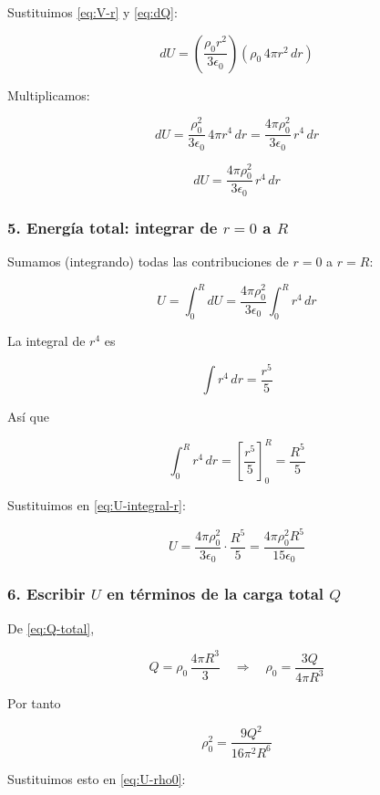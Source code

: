 \documentclass{article}
\begin{document}
Sustituimos \eqref{eq:V-r} y \eqref{eq:dQ}:

\[
dU = \left(\frac{\rho_{0}r^{2}}{3\epsilon_{0}}\right)
      \left(\rho_{0}\,4\pi r^{2}\,dr\right)
\]

Multiplicamos:

\[
dU = \frac{\rho_{0}^{2}}{3\epsilon_{0}}\,4\pi r^{4}\,dr
= \frac{4\pi\rho_{0}^{2}}{3\epsilon_{0}}\,r^{4}\,dr
\]

\begin{equation}
dU = \frac{4\pi\rho_{0}^{2}}{3\epsilon_{0}}\,r^{4}\,dr
\label{eq:dU}
\end{equation}

\subsubsection*{5. Energía total: integrar de $r=0$ a $R$}

Sumamos (integrando) todas las contribuciones de $r=0$ a $r=R$:

\begin{equation}
U = \int_{0}^{R} dU
= \frac{4\pi\rho_{0}^{2}}{3\epsilon_{0}}\int_{0}^{R} r^{4}\,dr
\label{eq:U-integral-r}
\end{equation}

La integral de $r^{4}$ es

\[
\int r^{4}\,dr = \frac{r^{5}}{5}
\]

Así que

\[
\int_{0}^{R} r^{4}\,dr = \left[\frac{r^{5}}{5}\right]_{0}^{R}
= \frac{R^{5}}{5}
\]

Sustituimos en \eqref{eq:U-integral-r}:

\begin{equation}
U = \frac{4\pi\rho_{0}^{2}}{3\epsilon_{0}}\cdot\frac{R^{5}}{5}
= \frac{4\pi\rho_{0}^{2}R^{5}}{15\epsilon_{0}}
\label{eq:U-rho0}
\end{equation}

\subsubsection*{6. Escribir $U$ en términos de la carga total $Q$}

De \eqref{eq:Q-total},

\[
Q = \rho_{0}\,\frac{4\pi R^{3}}{3}
\quad\Longrightarrow\quad
\rho_{0} = \frac{3Q}{4\pi R^{3}}
\]

Por tanto

\[
\rho_{0}^{2} = \frac{9Q^{2}}{16\pi^{2}R^{6}}
\]

Sustituimos esto en \eqref{eq:U-rho0}:
\end{document}
